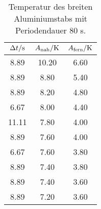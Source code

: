 \begin{table}

	\centering

	\caption{Temperatur des breiten Aluminiumstabs mit Periodendauer 80 s.}


	\begin{tabular}{S[table-format=3.2] S[table-format=3.2]S[table-format=3.2]}

		\toprule

		{$\Delta t/\si[per-mode=reciprocal]{\second}$}&{$A_\text{nah}/\si[per-mode=reciprocal]{\kelvin}$}&{$A_\text{fern}/\si[per-mode=reciprocal]{\kelvin}$} \\

		\midrule

		8.89 & 10.20 & 6.60 \\

		8.89 & 8.80 & 5.40 \\

		8.89 & 8.20 & 4.80 \\

		6.67 & 8.00 & 4.40 \\

		11.11 & 7.80 & 4.00 \\

		8.89 & 7.60 & 4.00 \\

		6.67 & 7.60 & 3.80 \\

		8.89 & 7.40 & 3.80 \\

		8.89 & 7.40 & 3.60 \\

		8.89 & 7.20 & 3.60 \\

		\bottomrule

	\end{tabular}

	\label{tab:tab3}

\end{table}


